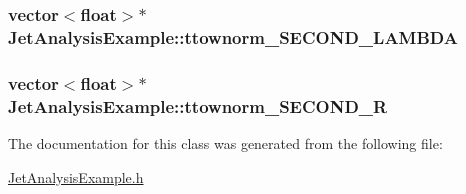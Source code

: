 \subsubsection[{\texorpdfstring{ttownorm\+\_\+\+S\+E\+C\+O\+N\+D\+\_\+\+L\+A\+M\+B\+DA}{ttownorm_SECOND_LAMBDA}}]{\setlength{\rightskip}{0pt plus 5cm}vector$<$float$>$$\ast$ Jet\+Analysis\+Example\+::ttownorm\+\_\+\+S\+E\+C\+O\+N\+D\+\_\+\+L\+A\+M\+B\+DA}\hypertarget{classJetAnalysisExample_a25d960fd69e545bcf381e927ecb5ea62}{}\label{classJetAnalysisExample_a25d960fd69e545bcf381e927ecb5ea62}
\subsubsection[{\texorpdfstring{ttownorm\+\_\+\+S\+E\+C\+O\+N\+D\+\_\+R}{ttownorm_SECOND_R}}]{\setlength{\rightskip}{0pt plus 5cm}vector$<$float$>$$\ast$ Jet\+Analysis\+Example\+::ttownorm\+\_\+\+S\+E\+C\+O\+N\+D\+\_\+R}\hypertarget{classJetAnalysisExample_a03a03b552de5469d9f995eaecb39c6fd}{}\label{classJetAnalysisExample_a03a03b552de5469d9f995eaecb39c6fd}


The documentation for this class was generated from the following file\+:\begin{DoxyCompactItemize}
\item 
\hyperlink{JetAnalysisExample_8h}{Jet\+Analysis\+Example.\+h}\end{DoxyCompactItemize}
